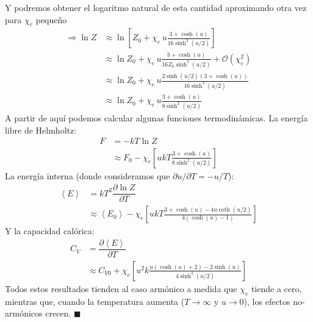 \documentclass[]{article}
\numberwithin{equation}{section}
\newcommand{\0}{\textcolor{gray}{0}}
\newcommand{\pd}[2]{\dfrac{\partial #1}{\partial #2}}
\newcommand{\lpd}[2]{\partial #1/\partial #2}
\newcommand{\pr}[1]{\left\langle #1 \right\rangle }
\newcommand{\qed}{\hfill\(\blacksquare\)}
\begin{document}
Y podremos obtener el logaritmo natural de esta cantidad aproximando otra vez para $\chi_e$ pequeño
\begin{align}
	\Rightarrow \ln Z &\approx \ln \left[Z_0 + \chi_e \, u \frac{3 + \cosh (u)}{16 \sinh^3\left(u/2\right)}\right]\nonumber\\
	&\approx \ln Z_0 + \chi_e \, u \frac{3 + \cosh (u)}{16 Z_0 \sinh^3\left(u/2\right)} + \mathcal{O}\left(\chi_e ^2\right)\nonumber\\
	&\approx \ln Z_0 + \chi_e \, u \frac{2 \sinh(u/2)\left(3 + \cosh (u)\right)}{16 \sinh^3\left(u/2\right)}\nonumber\\
	&\approx \ln Z_0 + \chi_e \, u \frac{3 + \cosh (u)}{8 \sinh^2\left(u/2\right)}
\end{align}
A partir de aquí podemos calcular algunas funciones termodinámicas. La energía libre de Helmholtz:
\begin{align}
	F &= -kT\ln Z \nonumber\\
	&\approx F_0 - \chi_e\left[ u kT \frac{3 + \cosh (u)}{8 \sinh^2\left(u/2\right)}\right]
\end{align}
La energía interna (donde consideramos que $\lpd{u}{T} = -u/T$):
\begin{align}
	\pr{E} &= kT^2 \pd{\ln Z}{T}\nonumber\\
	&\approx \pr{E_0} -  \chi_e \left[u k T \frac{3 + \cosh (u)-4 u \coth \left(u/2\right)}{4 (\cosh (u)-1)}\right]
\end{align}
Y la capacidad calórica:
\begin{align}
	C_V &= \pd{\pr{E}}{T}\nonumber\\
	&\approx C_{V0} + \chi_e \left[u^2 k \frac{u (\cosh (u)+2) - 2 \sinh (u)}{4\sinh^4\left(u/2\right)} \right]
\end{align}
Todos estos resultados tienden al caso armónico a medida que $\chi_e$ tiende a cero, mientras que, cuando la temperatura aumenta ($T\rightarrow\infty$ y $u\rightarrow 0$), los efectos no-armónicos crecen.
\qed

\end{document}
